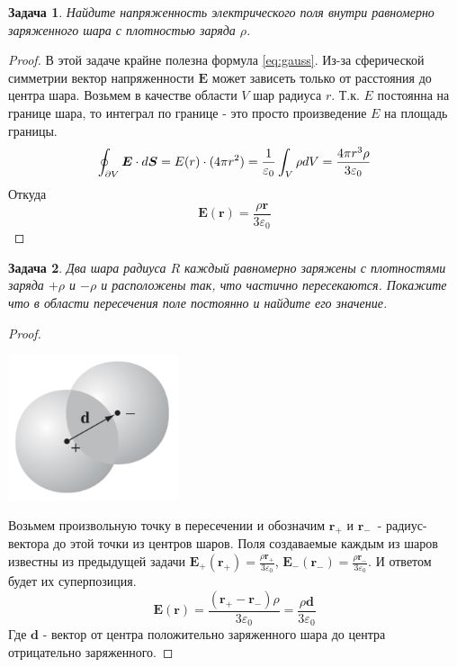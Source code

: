 \documentclass[a4paper,12pt]{article}
\newtheorem{problem}{Задача}
\newenvironment{solution}{\renewcommand{\proofname}{\unskip\indent\nopunct}\begin{proof}}{\end{proof}}
\numberwithin{equation}{section}
\begin{document}
\begin{problem}
{\normalfont \cite[p.~76, Problem 2.12]{Griffiths:1492149}}
Найдите напряженность электрического поля внутри равномерно заряженного шара с плотностью заряда $\rho$.
\end{problem}
\begin{solution}
В этой задаче крайне полезна формула \ref{eq:gauss}.
Из-за сферической симметрии вектор напряженности $\bm{E}$ может зависеть только от расстояния до центра шара.
Возьмем в качестве области $V$ шар радиуса $r$.
Т.к. $E$ постоянна на границе шара, то интеграл по границе - это просто произведение $E$ на площадь границы.
\begin{equation}
    \oint_{\partial V} \bm{E} \cdot d\bm{S} = E(r) \cdot (4 \pi r^2) = \\
    \frac{1}{\varepsilon_0} \int_{V} \rho dV = \frac{4 \pi r^3 \rho}{3 \varepsilon_0}
\end{equation}
Откуда
\begin{equation}
    \bm{E}(\bm{r}) = \frac{\rho \bm{r}}{3 \varepsilon_0}
\end{equation}
\end{solution}


\begin{problem}
    {\normalfont \cite[p.~76, Problem 2.18]{Griffiths:1492149}}
    Два шара радиуса $R$ каждый равномерно заряжены с плотностями заряда $+\rho$ и $-\rho$ и расположены так, что частично пересекаются.
    Покажите что в области пересечения поле постоянно и найдите его значение.
\end{problem}
\begin{solution}
\begin{center}
    \includegraphics[width=5cm]{1.png}
\end{center}
Возьмем произвольную точку в пересечении и обозначим $\bm{r_+}$ и $\bm{r_-}$~- радиус-вектора до этой точки из центров шаров.
Поля создаваемые каждым из шаров известны из предыдущей задачи $\bm{E_+}(\bm{r_+}) = \frac{\rho \bm{r_+}}{3 \varepsilon_0}$, $\bm{E_-}(\bm{r_-}) = \frac{\rho \bm{r_-}}{3 \varepsilon_0}$.
И ответом будет их суперпозиция.
\begin{equation}
    \bm{E}(\bm{r}) = \frac{(\bm{r_+} - \bm{r_-}) \rho}{3 \varepsilon_0} = \frac{\rho \bm{d}}{3 \varepsilon_0}
\end{equation}
Где $\bm{d}$ - вектор от центра положительно заряженного шара до центра отрицательно заряженного.
\end{solution}
\end{document}
